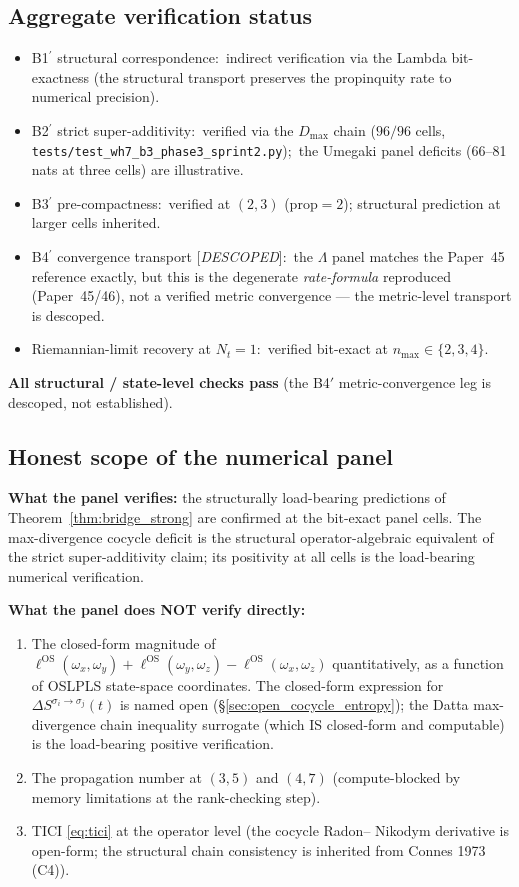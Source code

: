 \documentclass[11pt,a4paper]{article}
\theoremstyle{plain}
\theoremstyle{definition}
\newcommand{\nmax}{n_{\max}}
\newcommand{\Nt}{N_{t}}
\newcommand{\ellOS}{\ell^{\mathrm{OS}}}
\newcommand{\DelS}[2]{\Delta S^{\sigma_{#1}\to\sigma_{#2}}}
\begin{document}
\subsection{Aggregate verification status}
\label{sec:aggregate_panel_status}

\begin{itemize}
\item B1$^{\prime}$ structural correspondence:\ indirect verification
via the Lambda bit-exactness (the structural transport preserves the
propinquity rate to numerical precision).
\item B2$^{\prime}$ strict super-additivity:\ verified via the
$D_{\max}$ chain ($96/96$ cells, \texttt{tests/test\_wh7\_b3\_phase3\_sprint2.py});\
the Umegaki panel deficits (66--81 nats at three cells) are illustrative.
\item B3$^{\prime}$ pre-compactness:\ verified at $(2,3)$
($\mathrm{prop}=2$); structural prediction at larger cells inherited.
\item B4$^{\prime}$ convergence transport [\emph{DESCOPED}]:\ the
$\Lambda$ panel matches the Paper~45 reference exactly, but this is the
degenerate \emph{rate-formula} reproduced (Paper~45/46), not a verified
metric convergence --- the metric-level transport is descoped.
\item Riemannian-limit recovery at $\Nt=1$:\ verified bit-exact at
$\nmax\in\{2,3,4\}$.
\end{itemize}

\textbf{All structural / state-level checks pass} (the B4$'$
metric-convergence leg is descoped, not established).

\subsection{Honest scope of the numerical panel}
\label{sec:numerical_panel_scope}

\textbf{What the panel verifies:} the structurally load-bearing
predictions of Theorem~\ref{thm:bridge_strong} are confirmed at the
bit-exact panel cells. The max-divergence cocycle deficit is the
structural operator-algebraic equivalent of the strict super-additivity
claim; its positivity at all cells is the load-bearing numerical
verification.

\textbf{What the panel does NOT verify directly:}
\begin{enumerate}
\item The closed-form magnitude of $\ellOS(\omega_{x},\omega_{y})+
\ellOS(\omega_{y},\omega_{z})-\ellOS(\omega_{x},\omega_{z})$
quantitatively, as a function of OSLPLS state-space coordinates. The
closed-form expression for $\DelS{i}{j}(t)$ is named open
(\S\ref{sec:open_cocycle_entropy}); the Datta max-divergence chain inequality surrogate
(which IS closed-form and computable) is the load-bearing positive
verification.
\item The propagation number at $(3,5)$ and $(4,7)$ (compute-blocked
by memory limitations at the rank-checking step).
\item TICI \eqref{eq:tici} at the operator level (the cocycle Radon--
Nikodym derivative is open-form; the structural chain consistency is
inherited from Connes 1973 (C4)).
\end{enumerate}
\end{document}
